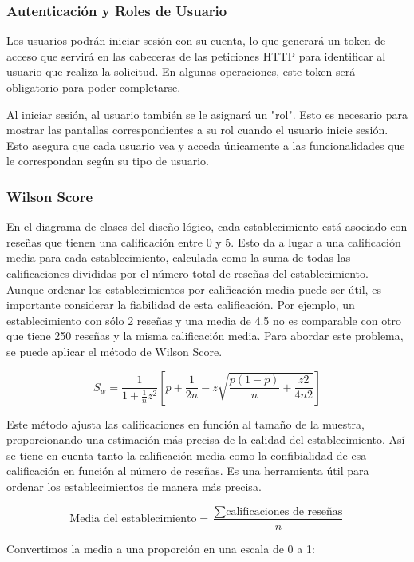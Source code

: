 \subsubsection{Autenticación y Roles de Usuario}

Los usuarios podrán iniciar sesión con su cuenta, lo que generará un token de acceso que servirá en las cabeceras de las peticiones HTTP para identificar al usuario que realiza la solicitud. En algunas operaciones, este token será obligatorio para poder completarse.

Al iniciar sesión, al usuario también se le asignará un "rol". Esto es necesario para mostrar las pantallas correspondientes a su rol cuando el usuario inicie sesión. Esto asegura que cada usuario vea y acceda únicamente a las funcionalidades que le correspondan según su tipo de usuario.

\subsubsection{Wilson Score}

En el diagrama de clases del diseño lógico, cada establecimiento está asociado con reseñas que tienen una calificación entre 0 y 5. Esto da a lugar a una calificación media para cada establecimiento, calculada como la suma de todas las calificaciones divididas por el número total de reseñas del establecimiento. Aunque ordenar los establecimientos por calificación media puede ser útil, es importante considerar la fiabilidad de esta calificación. Por ejemplo, un establecimiento con sólo 2 reseñas y una media de 4.5 no es comparable con otro que tiene 250 reseñas y la misma calificación media. Para abordar este problema, se puede aplicar el método de Wilson Score.

\[ S_w = \frac{1}{{1 + \frac{1}{n} z^2}} \left[ p + \frac{1}{2n} - z\sqrt{\frac{p(1-p)}{n} + \frac{z2}{4n2}} \right] \]

Este método ajusta las calificaciones en función al tamaño de la muestra, proporcionando una estimación más precisa de la calidad del establecimiento. Así se tiene en cuenta tanto la calificación media como la confibialidad de esa calificación en función al número de reseñas. Es una herramienta útil para ordenar los establecimientos de manera más precisa.

\[
    \text{Media del establecimiento} = \frac{\sum \text{calificaciones de reseñas}}{n}
\]

Convertimos la media a una proporción en una escala de 0 a 1:


